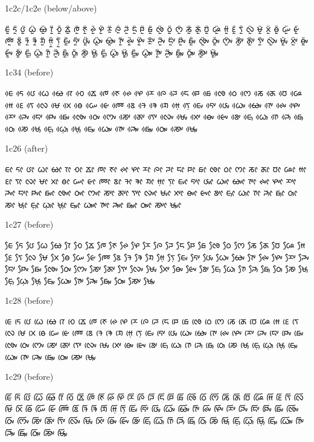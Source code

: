 \noindent
1c2c/1c2e (below/above)

\noindent
ᰀᰬᰮ ᰁᰬᰮ ᰂᰬᰮ ᰃᰬᰮ ᰄᰬᰮ ᰅᰬᰮ ᰆᰬᰮ ᰇᰬᰮ ᰈᰬᰮ ᰉᰬᰮ ᰊᰬᰮ ᰋᰬᰮ ᰌᰬᰮ ᰍᰬᰮ ᰎᰬᰮ ᰏᰬᰮ ᰐᰬᰮ ᰑᰬᰮ ᰒᰬᰮ ᰓᰬᰮ ᰔᰬᰮ ᰕᰬᰮ ᰖᰬᰮ ᰗᰬᰮ ᰘᰬᰮ ᰙᰬᰮ ᰚᰬᰮ ᰛᰬᰮ ᰜᰬᰮ ᰝᰬᰮ ᰞᰬᰮ ᰟᰬᰮ ᰠᰬᰮ ᰡᰬᰮ ᰢᰬᰮ ᰣᰬᰮ ᱍᰬᰮ ᱎᰬᰮ ᱏᰬᰮ ᰙ᰷ᰬᰮ ᰛ᰷ᰬᰮ ᰀᰤᰬᰮ ᰁᰤᰬᰮ ᰂᰤᰬᰮ ᰃᰤᰬᰮ ᰄᰤᰬᰮ ᰅᰤᰬᰮ ᰊᰤᰬᰮ ᰋᰤᰬᰮ ᰌᰤᰬᰮ ᰎᰤᰬᰮ ᰏᰤᰬᰮ ᰐᰤᰬᰮ ᰑᰤᰬᰮ ᰒᰤᰬᰮ ᰓᰤᰬᰮ ᰔᰤᰬᰮ ᰕᰤᰬᰮ ᰖᰤᰬᰮ ᰛᰤᰬᰮ ᰜᰤᰬᰮ ᰝᰤᰬᰮ ᰞᰤᰬᰮ ᰟᰤᰬᰮ ᰡᰤᰬᰮ ᰣᰤᰬᰮ ᰀᰥᰬᰮ ᰃᰥᰬᰮ ᰅᰥᰬᰮ ᰎᰥᰬᰮ ᰑᰥᰬᰮ ᰓᰥᰬᰮ ᰕᰥᰬᰮ ᰝᰥᰬᰮ ᰀ᰷ᰥᰬᰮ ᰃ᰷ᰥᰬᰮ ᰝ᰷ᰥᰬᰮ ᰀᰥᰤᰬᰮ ᰃᰥᰤᰬᰮ ᰅᰥᰤᰬᰮ ᰎᰥᰤᰬᰮ ᰑᰥᰤᰬᰮ ᰓᰥᰤᰬᰮ ᰕᰥᰤᰬᰮ ᰝᰥᰤᰬᰮ 


\noindent
1c34 (before)

\noindent
ᰀᰴ ᰁᰴ ᰂᰴ ᰃᰴ ᰄᰴ ᰅᰴ ᰆᰴ ᰇᰴ ᰈᰴ ᰉᰴ ᰊᰴ ᰋᰴ ᰌᰴ ᰍᰴ ᰎᰴ ᰏᰴ ᰐᰴ ᰑᰴ ᰒᰴ ᰓᰴ ᰔᰴ ᰕᰴ ᰖᰴ ᰗᰴ ᰘᰴ ᰙᰴ ᰚᰴ ᰛᰴ ᰜᰴ ᰝᰴ ᰞᰴ ᰟᰴ ᰠᰴ ᰡᰴ ᰢᰴ ᰣᰴ ᱍᰴ ᱎᰴ ᱏᰴ ᰙ᰷ᰴ ᰛ᰷ᰴ ᰀᰤᰴ ᰁᰤᰴ ᰂᰤᰴ ᰃᰤᰴ ᰄᰤᰴ ᰅᰤᰴ ᰊᰤᰴ ᰋᰤᰴ ᰌᰤᰴ ᰎᰤᰴ ᰏᰤᰴ ᰐᰤᰴ ᰑᰤᰴ ᰒᰤᰴ ᰓᰤᰴ ᰔᰤᰴ ᰕᰤᰴ ᰖᰤᰴ ᰛᰤᰴ ᰜᰤᰴ ᰝᰤᰴ ᰞᰤᰴ ᰟᰤᰴ ᰡᰤᰴ ᰣᰤᰴ ᰀᰥᰴ ᰃᰥᰴ ᰅᰥᰴ ᰎᰥᰴ ᰑᰥᰴ ᰓᰥᰴ ᰕᰥᰴ ᰝᰥᰴ ᰀ᰷ᰥᰴ ᰃ᰷ᰥᰴ ᰝ᰷ᰥᰴ ᰀᰥᰤᰴ ᰃᰥᰤᰴ ᰅᰥᰤᰴ ᰎᰥᰤᰴ ᰑᰥᰤᰴ ᰓᰥᰤᰴ ᰕᰥᰤᰴ ᰝᰥᰤᰴ 

\noindent
1c26 (after)

\noindent
ᰀᰦ ᰁᰦ ᰂᰦ ᰃᰦ ᰄᰦ ᰅᰦ ᰆᰦ ᰇᰦ ᰈᰦ ᰉᰦ ᰊᰦ ᰋᰦ ᰌᰦ ᰍᰦ ᰎᰦ ᰏᰦ ᰐᰦ ᰑᰦ ᰒᰦ ᰓᰦ ᰔᰦ ᰕᰦ ᰖᰦ ᰗᰦ ᰘᰦ ᰙᰦ ᰚᰦ ᰛᰦ ᰜᰦ ᰝᰦ ᰞᰦ ᰟᰦ ᰠᰦ ᰡᰦ ᰢᰦ ᰣᰦ ᱍᰦ ᱎᰦ ᱏᰦ ᰙ᰷ᰦ ᰛ᰷ᰦ ᰀᰤᰦ ᰁᰤᰦ ᰂᰤᰦ ᰃᰤᰦ ᰄᰤᰦ ᰅᰤᰦ ᰊᰤᰦ ᰋᰤᰦ ᰌᰤᰦ ᰎᰤᰦ ᰏᰤᰦ ᰐᰤᰦ ᰑᰤᰦ ᰒᰤᰦ ᰓᰤᰦ ᰔᰤᰦ ᰕᰤᰦ ᰖᰤᰦ ᰛᰤᰦ ᰜᰤᰦ ᰝᰤᰦ ᰞᰤᰦ ᰟᰤᰦ ᰡᰤᰦ ᰣᰤᰦ ᰀᰥᰦ ᰃᰥᰦ ᰅᰥᰦ ᰎᰥᰦ ᰑᰥᰦ ᰓᰥᰦ ᰕᰥᰦ ᰝᰥᰦ ᰀ᰷ᰥᰦ ᰃ᰷ᰥᰦ ᰝ᰷ᰥᰦ ᰀᰥᰤᰦ ᰃᰥᰤᰦ ᰅᰥᰤᰦ ᰎᰥᰤᰦ ᰑᰥᰤᰦ ᰓᰥᰤᰦ ᰕᰥᰤᰦ ᰝᰥᰤᰦ 

\noindent
1c27 (before)

\noindent
ᰀᰧ ᰁᰧ ᰂᰧ ᰃᰧ ᰄᰧ ᰅᰧ ᰆᰧ ᰇᰧ ᰈᰧ ᰉᰧ ᰊᰧ ᰋᰧ ᰌᰧ ᰍᰧ ᰎᰧ ᰏᰧ ᰐᰧ ᰑᰧ ᰒᰧ ᰓᰧ ᰔᰧ ᰕᰧ ᰖᰧ ᰗᰧ ᰘᰧ ᰙᰧ ᰚᰧ ᰛᰧ ᰜᰧ ᰝᰧ ᰞᰧ ᰟᰧ ᰠᰧ ᰡᰧ ᰢᰧ ᰣᰧ ᱍᰧ ᱎᰧ ᱏᰧ ᰙ᰷ᰧ ᰛ᰷ᰧ ᰀᰤᰧ ᰁᰤᰧ ᰂᰤᰧ ᰃᰤᰧ ᰄᰤᰧ ᰅᰤᰧ ᰊᰤᰧ ᰋᰤᰧ ᰌᰤᰧ ᰎᰤᰧ ᰏᰤᰧ ᰐᰤᰧ ᰑᰤᰧ ᰒᰤᰧ ᰓᰤᰧ ᰔᰤᰧ ᰕᰤᰧ ᰖᰤᰧ ᰛᰤᰧ ᰜᰤᰧ ᰝᰤᰧ ᰞᰤᰧ ᰟᰤᰧ ᰡᰤᰧ ᰣᰤᰧ ᰀᰥᰧ ᰃᰥᰧ ᰅᰥᰧ ᰎᰥᰧ ᰑᰥᰧ ᰓᰥᰧ ᰕᰥᰧ ᰝᰥᰧ ᰀ᰷ᰥᰧ ᰃ᰷ᰥᰧ ᰝ᰷ᰥᰧ ᰀᰥᰤᰧ ᰃᰥᰤᰧ ᰅᰥᰤᰧ ᰎᰥᰤᰧ ᰑᰥᰤᰧ ᰓᰥᰤᰧ ᰕᰥᰤᰧ ᰝᰥᰤᰧ 

\noindent
1c28 (before)

\noindent
ᰀᰨ ᰁᰨ ᰂᰨ ᰃᰨ ᰄᰨ ᰅᰨ ᰆᰨ ᰇᰨ ᰈᰨ ᰉᰨ ᰊᰨ ᰋᰨ ᰌᰨ ᰍᰨ ᰎᰨ ᰏᰨ ᰐᰨ ᰑᰨ ᰒᰨ ᰓᰨ ᰔᰨ ᰕᰨ ᰖᰨ ᰗᰨ ᰘᰨ ᰙᰨ ᰚᰨ ᰛᰨ ᰜᰨ ᰝᰨ ᰞᰨ ᰟᰨ ᰠᰨ ᰡᰨ ᰢᰨ ᰣᰨ ᱍᰨ ᱎᰨ ᱏᰨ ᰙ᰷ᰨ ᰛ᰷ᰨ ᰀᰤᰨ ᰁᰤᰨ ᰂᰤᰨ ᰃᰤᰨ ᰄᰤᰨ ᰅᰤᰨ ᰊᰤᰨ ᰋᰤᰨ ᰌᰤᰨ ᰎᰤᰨ ᰏᰤᰨ ᰐᰤᰨ ᰑᰤᰨ ᰒᰤᰨ ᰓᰤᰨ ᰔᰤᰨ ᰕᰤᰨ ᰖᰤᰨ ᰛᰤᰨ ᰜᰤᰨ ᰝᰤᰨ ᰞᰤᰨ ᰟᰤᰨ ᰡᰤᰨ ᰣᰤᰨ ᰀᰥᰨ ᰃᰥᰨ ᰅᰥᰨ ᰎᰥᰨ ᰑᰥᰨ ᰓᰥᰨ ᰕᰥᰨ ᰝᰥᰨ ᰀ᰷ᰥᰨ ᰃ᰷ᰥᰨ ᰝ᰷ᰥᰨ ᰀᰥᰤᰨ ᰃᰥᰤᰨ ᰅᰥᰤᰨ ᰎᰥᰤᰨ ᰑᰥᰤᰨ ᰓᰥᰤᰨ ᰕᰥᰤᰨ ᰝᰥᰤᰨ 

\noindent
1c29 (before)

\noindent
ᰀᰩ ᰁᰩ ᰂᰩ ᰃᰩ ᰄᰩ ᰅᰩ ᰆᰩ ᰇᰩ ᰈᰩ ᰉᰩ ᰊᰩ ᰋᰩ ᰌᰩ ᰍᰩ ᰎᰩ ᰏᰩ ᰐᰩ ᰑᰩ ᰒᰩ ᰓᰩ ᰔᰩ ᰕᰩ ᰖᰩ ᰗᰩ ᰘᰩ ᰙᰩ ᰚᰩ ᰛᰩ ᰜᰩ ᰝᰩ ᰞᰩ ᰟᰩ ᰠᰩ ᰡᰩ ᰢᰩ ᰣᰩ ᱍᰩ ᱎᰩ ᱏᰩ ᰙ᰷ᰩ ᰛ᰷ᰩ ᰀᰤᰩ ᰁᰤᰩ ᰂᰤᰩ ᰃᰤᰩ ᰄᰤᰩ ᰅᰤᰩ ᰊᰤᰩ ᰋᰤᰩ ᰌᰤᰩ ᰎᰤᰩ ᰏᰤᰩ ᰐᰤᰩ ᰑᰤᰩ ᰒᰤᰩ ᰓᰤᰩ ᰔᰤᰩ ᰕᰤᰩ ᰖᰤᰩ ᰛᰤᰩ ᰜᰤᰩ ᰝᰤᰩ ᰞᰤᰩ ᰟᰤᰩ ᰡᰤᰩ ᰣᰤᰩ ᰀᰥᰩ ᰃᰥᰩ ᰅᰥᰩ ᰎᰥᰩ ᰑᰥᰩ ᰓᰥᰩ ᰕᰥᰩ ᰝᰥᰩ ᰀ᰷ᰥᰩ ᰃ᰷ᰥᰩ ᰝ᰷ᰥᰩ ᰀᰥᰤᰩ ᰃᰥᰤᰩ ᰅᰥᰤᰩ ᰎᰥᰤᰩ ᰑᰥᰤᰩ ᰓᰥᰤᰩ ᰕᰥᰤᰩ ᰝᰥᰤᰩ 

